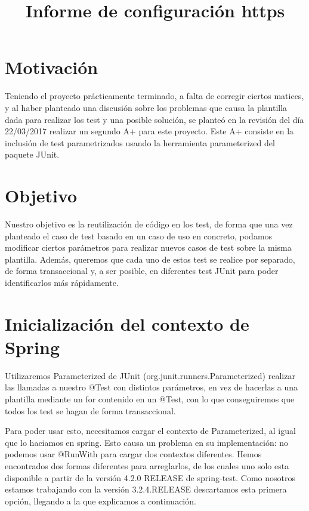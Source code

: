 \documentclass[a4paper]{article}
\title{Informe de configuración https}
\date{}
\begin{document}
\setlength{\voffset}{-5em}
\maketitle

\section{Motivación}

Teniendo el proyecto prácticamente terminado, a falta de corregir ciertos matices, y al haber planteado una discusión sobre los problemas que causa la plantilla dada para realizar los test y una posible solución, se planteó en la revisión del día 22/03/2017 realizar un segundo A+ para este proyecto. Este A+ consiste en la inclusión de test parametrizados usando la herramienta parameterized del paquete JUnit.

\section{Objetivo}

Nuestro objetivo es la reutilización de código en los test, de forma que una vez planteado el caso de test basado en un caso de uso en concreto, podamos modificar ciertos parámetros para realizar nuevos casos de test sobre la misma plantilla. Además, queremos que cada uno de estos test se realice por separado, de forma transaccional y, a ser posible, en diferentes test JUnit para poder identificarlos más rápidamente.

\section{Inicialización del contexto de Spring}

Utilizaremos Parameterized de JUnit (org.junit.runners.Parameterized) realizar las llamadas a nuestro @Test con distintos parámetros, en vez de hacerlas a una plantilla mediante un for contenido en un @Test, con lo que conseguiremos que todos los test se hagan de forma transaccional. 

Para poder usar esto, necesitamos cargar el contexto de Parameterized, al igual que lo haciamos en spring. Esto causa un problema en su implementación: no podemos usar @RunWith para cargar dos contextos diferentes. Hemos encontrados dos formas diferentes para arreglarlos, de los cuales uno solo esta disponible a partir de la versión 4.2.0 RELEASE de spring-test. Como nosotros estamos trabajando con la versión 3.2.4.RELEASE descartamos esta primera opción, llegando a la que explicamos a continuación.
\end{document}
